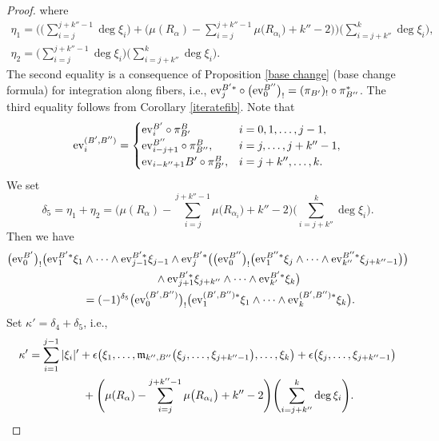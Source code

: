 \documentclass[pdftex]{sigma}
\numberwithin{equation}{section}
\theoremstyle{definition}
\begin{document}
\begin{proof}
where
\begin{gather*}
\eta_1= \Biggl( \Biggl(\sum_{i=j}^{j +k'' -1} \deg\xi_i\Biggr) + \Biggl(\mu(R_{\alpha}) - \sum_{i=j}^{j+k''-1} \mu\bigl(R_{\alpha_i}\bigr) + k'' -2\Biggr) \Biggr) \Biggl(\sum_{i=j+k''}^k \deg \xi_i\Biggr),
\\
\eta_2 = \Bigg(\sum_{i=j}^{j +k'' -1} \deg \xi_i\Bigg) \Bigg(\sum_{i=j+k''}^k \deg \xi_i\Bigg).
\end{gather*}
The second equality is a consequence of Proposition \ref{base change} (base change formula) for integration along fibers, i.e., ${\rm ev}_j^{B'*} \circ \bigl({\rm ev}_0^{B''}\bigr)_! = (\pi_{B'})_! \circ \pi_{B''}^*$.
The third equality follows from Corollary \ref{iteratefib}.
Note that
\begin{equation*}
{\rm ev}_i^{(B',B'')} =
\begin{cases}
{\rm ev}_i^{B'} \circ \pi^B_{B'} & i= 0, 1, \dots, j-1, \\
{\rm ev}_{i-j+1}^{B''} \circ \pi^B_{B''}, & i= j, \dots, j + k'' -1, \\
{\rm ev}_{i -k''+1}{B'} \circ \pi^B_{B'}, & i= j + k'', \dots, k.
\end{cases}
\end{equation*}
We set
\[\delta_5 = \eta_1 + \eta_2 = \Biggl( \mu(R_{\alpha}) - \sum_{i=j}^{j+k''-1} \mu\bigl(R_{\alpha_i}\bigr) + k'' -2\Biggr) \Biggl(\sum_{i=j+k''}^k \deg \xi_i\Biggr).\]
Then we have
\begin{gather} %
 \bigl({\rm ev}_0^{B'}\bigr)_! \bigl( {\rm ev}_1^{B'*}\xi_1 \wedge \dots \wedge {\rm ev}_{j-1}^{B'*} \xi_{j-1}
 \wedge {\rm ev}_j^{B'*} \bigl( \bigl({\rm ev}_0^{B''}\bigr)_! \bigl({\rm ev}_1^{B''*} \xi_j \wedge \dots \wedge {\rm ev}_{k''}^{B''*} \xi_{j+k''-1} \bigr)\bigr) \nonumber \\ \hphantom{\bigl({\rm ev}_0^{B'}\bigr)_! \bigl(}{}
 \wedge {\rm ev}_{j+1}^{B'*} \xi_{j+k''} \wedge \dots \wedge {\rm ev}_{k'}^{B'*} \xi_k \bigr) \nonumber \\
\qquad{} = (-1)^{\delta_5} \bigl({\rm ev}_0^{(B',B'')}\bigr)_! \bigl({\rm ev}_1^{(B',B'')*} \xi_1 \wedge \dots \wedge {\rm ev}_k^{(B',B'')*} \xi_k\bigr). \label{equality2}
\end{gather}
Set $\kappa' = \delta_4 + \delta_5$, i.e.,
\begin{gather*}
\kappa' = \sum_{i=1}^{j-1} \vert \xi_i \vert' + \epsilon\bigl(\xi_1, \dots, {\mathfrak m}_{k'',B''}\bigl(\xi_j, \dots, \xi_{j+k''-1}\bigr), \dots, \xi_k\bigr) + \epsilon\bigl(\xi_j, \dots, \xi_{j+k''-1}\bigr)  \\ \hphantom{\kappa' =}{}
 + \Biggl( \mu(R_{\alpha}) - \sum_{i=j}^{j+k''-1} \mu\bigl(R_{\alpha_i}\bigr) + k'' -2\Biggr) \Biggl(\sum_{i=j+k''}^k \deg \xi_i\Biggr).
\end{gather*}


\end{proof}
\end{document}
